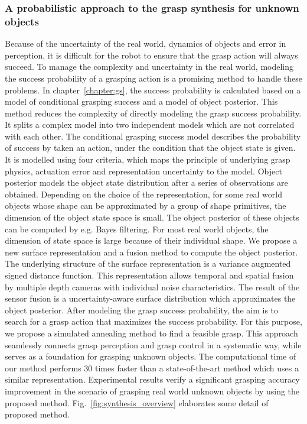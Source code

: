 \subsubsection{A probabilistic approach to the grasp synthesis for unknown objects }
Because of the uncertainty of the real world, dynamics of objects and error in perception, it is difficult for the robot to ensure that the grasp action will always succeed. To manage the complexity and uncertainty in the real world, modeling the success probability of a grasping action is a promising method to handle these problems. In chapter~\ref{chapter:gs}, the success probability is calculated based on a model of conditional grasping success and a model of object posterior. This method reduces the complexity of directly modeling the grasp success probability. It splits a complex model into two independent models which are not correlated with each other. The conditional grasping success model describes the probability of success by taken an action, under the condition that the object state is given. It is modelled using four criteria, which maps the principle of underlying grasp physics, actuation error and representation uncertainty to the model. Object posterior models the object state distribution after a series of observations are obtained. Depending on the choice of the representation, for some real world objects whose shape can be approximated by a group of shape primitives, the dimension of the object state space is small. The object posterior of these objects can be computed by e.g. Bayes filtering. For most real world objects, the dimension of state space is large because of their individual shape. We propose a new surface representation and a fusion method to compute the object posterior. The underlying structure of the surface representation is a variance augmented signed distance function. This representation allows temporal and spatial fusion by multiple depth cameras with individual noise characteristics. The result of the sensor fusion is a uncertainty-aware surface distribution which approximates the object posterior. After modeling the grasp success probability, the aim is to search for a grasp action that maximizes the success probability. For this purpose, we propose a simulated annealing method to find a feasible grasp. This approach seamlessly connects grasp perception and grasp control in a systematic way, while serves as a foundation for grasping unknown objects. The computational time of our method performs 30 times faster than a state-of-the-art method which uses a similar representation. Experimental results verify a significant grasping accuracy improvement in the scenario of grasping real world unknown objects by using the proposed method. Fig.~\ref{fig:synthesis_overview} elaborates some detail of proposed  method. 
